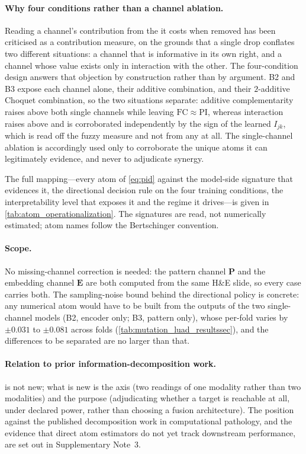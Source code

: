 \paragraph{Why four conditions rather than a channel ablation.}
Reading a channel's contribution from the \auroc{} it costs when removed
has been criticised as a contribution measure, on the grounds that a
single drop conflates two different situations: a channel that is
informative in its own right, and a channel whose value exists only in
interaction with the other.
The four-condition design answers that objection by construction rather
than by argument. B2 and B3 expose each channel alone, \piabmil{} their
additive combination, and \fcmil{} their $2$-additive Choquet
combination, so the two situations separate: additive complementarity
raises \piabmil{} above both single channels while leaving
$\mathrm{FC}\!\approx\!\mathrm{PI}$, whereas interaction raises \fcmil{}
above \piabmil{} and is corroborated independently by the sign of the
learned $I_{jk}$, which is read off the fuzzy measure and not from any
\auroc{} at all. The single-channel ablation is accordingly used only
to corroborate the unique atoms it can legitimately evidence, and never
to adjudicate synergy.

The full mapping---every atom of \cref{eq:pid} against the model-side
signature that evidences it, the directional decision rule on the four
training conditions, the interpretability level that exposes it and the
regime it drives---is given in \cref{tab:atom_operationalization}. The signatures are
read, not numerically estimated; atom names follow the Bertschinger
convention.\cite{bertschinger2014unique}

\paragraph{Scope.}
No missing-channel correction\cite{choi2025icym2i} is needed: the
pattern channel $\mathbf{P}$ and the embedding channel $\mathbf{E}$ are
both computed from the same H\&E slide, so every case carries both. The
sampling-noise bound behind the directional policy is concrete: any
numerical atom would have to be built from the outputs of the two
single-channel models (B2, encoder only; B3, pattern only), whose
per-fold \auroc{} varies by $\pm 0.031$ to $\pm 0.081$ across folds
(\cref{tab:mutation_luad_resultssec}), and the differences to be
separated are no larger than that.

\paragraph{Relation to prior information-decomposition work.}
 is not new; what is new is the axis (two readings of one
modality rather than two modalities) and the purpose (adjudicating
whether a target is reachable at all, under declared power, rather than
choosing a fusion architecture). The position against the published
decomposition work in computational
pathology,\cite{liang2023quantifying,saisan2026ceilings} and the evidence
that direct atom estimators do not yet track downstream
performance,\cite{zhang2025evaluatingpid} are set out in Supplementary
Note~3.

